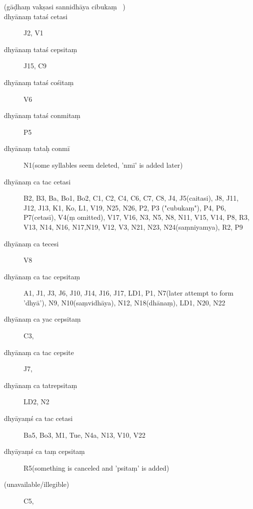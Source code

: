 \begin{ekdosis}
\begin{marma}[hp01_048]
  \begin{description}
  \item[(gāḍhaṃ vakṣasi sannidhāya cibukaṃ ~)]
  \item[dhyānaṃ tataś cetasi]        J2, V1
  \item[dhyānaṃ tataś cepsitaṃ]        J15, C9
  \item[dhyānaṃ tataś cośitaṃ]        V6
  \item[dhyānaṃ tataś conmitaṃ]        P5
  \item[dhyānaṃ tataḥ conmī]        N1(some syllables seem deleted, 'nmī' is added later)
  \item[dhyānaṃ ca tac cetasi] B2, B3, Ba, Bo1, Bo2, C1, C2, C4, C6, C7, C8, J4, J5(caitasi), J8, J11, J12, J13, K1, Ko, L1, V19, N25, N26, P2, P3 ("cubukaṃ"), P4, P6, P7(cetasī), V4(ṃ omitted), V17, V16, N3, N5, N8, N11, V15, V14, P8, R3, V13, N14, N16, N17,N19, V12, V3, N21, N23, N24(saṃniyamya), R2, P9
  \item[dhyānaṃ ca tecesi]        V8
  \item[dhyānaṃ ca tac cepsitaṃ] A1, J1, J3, J6, J10, J14, J16, J17, LD1, P1, N7(later attempt to form 'dhyā'), N9, N10(saṃvidhāya), N12, N18(dhānaṃ), LD1, N20, N22
  \item[dhyānaṃ ca yac cepsitaṃ]        C3,
  \item[dhyānaṃ ca tac cepsite]        J7,
  \item[dhyānaṃ ca tatrepsitaṃ]        LD2, N2
  \item[dhyāyaṃś ca tac cetasi]        Ba5, Bo3, M1, Tue, N4a, N13, V10, V22
  \item[dhyāyaṃś ca taṃ cepsitaṃ]        R5(something is canceled and 'psitaṃ' is added)
  \item[(unavailable/illegible)]   C5,
  \end{description}


\end{marma}
\end{ekdosis}
